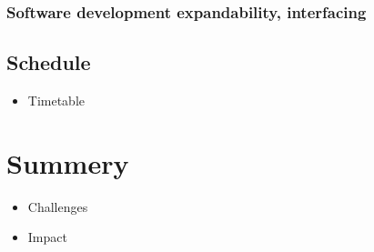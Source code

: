 \documentclass[a4paper,11pt]{article}
\begin{document}
\subsubsection{Software development expandability, interfacing}

\subsection{Schedule}
\begin{itemize}
\item Timetable
\end{itemize}

\section{Summery}
\label{sec:summery}
\begin{itemize}
\item Challenges
\item Impact
\end{itemize}




\end{document}
